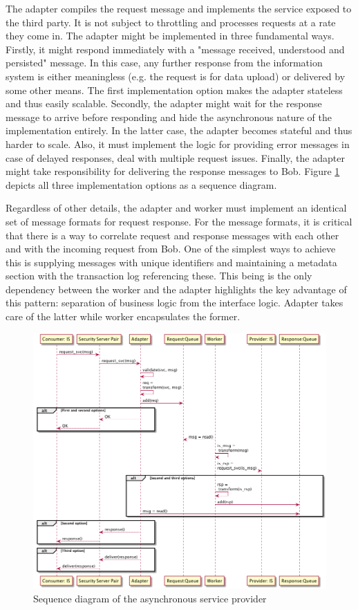 \documentclass[10pt,a4paper]{article}
\begin{document}
The adapter compiles the request message and implements the service exposed to the third party. It is not subject to throttling and processes requests at a rate they come in. The adapter might be implemented in three fundamental ways. Firstly, it might respond immediately with a "message received, understood and persisted" message. In this case, any further response from the information system is either meaningless (e.g. the request is for data upload) or delivered by some other means. The first implementation option makes the adapter  stateless and thus easily scalable. Secondly, the adapter might wait for the response message to arrive before responding and hide the asynchronous nature of the implementation entirely. In the latter case, the adapter becomes stateful and thus harder to scale. Also, it must implement the logic for providing error messages in case of delayed responses, deal with multiple request issues. Finally, the adapter might take responsibility for delivering the response messages to Bob. Figure \ref{fig:p:5:async} depicts all three implementation options as a sequence diagram.

Regardless of other details, the adapter and worker must implement an identical set of message formats for request response. For the message formats, it is critical that there is a way to correlate request and response messages with each other and with the incoming request from Bob. One of the simplest ways to achieve this is supplying messages with unique identifiers and maintaining a metadata section with the transaction log referencing these. This being is the only dependency between the worker and the adapter highlights the key advantage of this pattern: separation of business logic from the interface logic. Adapter takes care of the latter while worker encapsulates the former.

\begin{figure}[htp]
	\begin{center}
		\includegraphics[width=.85\textwidth]{gfx/5_seq.png}
		\caption{Sequence diagram of the asynchronous service provider}
		\label{fig:p:5:async}
	\end{center}
\end{figure}
\end{document}
